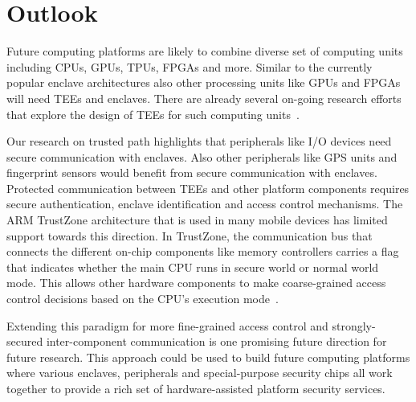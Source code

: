 
\section*{Outlook}



Future computing platforms are likely to combine diverse set of computing units including CPUs, GPUs, TPUs, FPGAs and more. %
Similar to the currently popular enclave architectures also other processing units like GPUs and FPGAs will need TEEs and enclaves. There are already several on-going research efforts that explore the design of TEEs for such computing units~\cite{volos2018graviton}.

Our research on trusted path highlights that peripherals like I/O devices need secure communication with enclaves. Also other peripherals like GPS units and fingerprint sensors would benefit from secure communication with enclaves. 
%
Protected communication between TEEs and other platform components requires secure authentication, enclave identification and access control mechanisms. The ARM TrustZone architecture that is used in many mobile devices has limited support towards this direction. In TrustZone, the communication bus that connects the different on-chip components like memory controllers carries a flag that indicates whether the main CPU runs in secure world or normal world mode. This allows other hardware components to make coarse-grained access control decisions based on the CPU's execution mode~\cite{ekberg2014untapped}. 


Extending this paradigm for more fine-grained access control and strongly-secured inter-component communication is one promising future direction for future research. This approach could be used to build future computing platforms where various enclaves, peripherals and special-purpose security chips all work together to provide a rich set of hardware-assisted platform security services.
